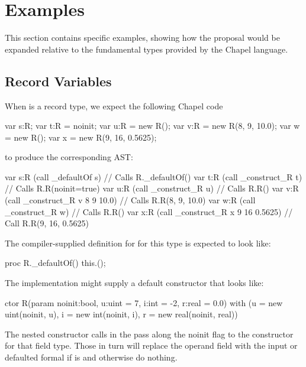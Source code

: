 \section{Examples}
\label{Examples}

This section contains specific examples, showing how the proposal would be expanded
relative to the fundamental types provided by the Chapel language.

\subsection{Record Variables}

When  is a record type, we expect the following Chapel code
\begin{chapel}
  var s:R;
  var t:R = noinit;
  var u:R = new R();
  var v:R = new R(8, 9, 10.0);
  var w = new R();
  var x = new R(9, 16, 0.5625);
\end{chapel}
\noindent
to produce the corresponding AST:
\begin{numberedchapel}
  var s:R
  (call _defaultOf s) // Calls R._defaultOf()
  var t:R
  (call _construct_R t) // Calls R.R(noinit=true)
  var u:R
  (call _construct_R u) // Calls R.R()
  var v:R
  (call _construct_R v 8 9 10.0) // Calls R.R(8, 9, 10.0)
  var w:R
  (call _construct_R w) // Calls R.R()
  var x:R
  (call _construct_R x 9 16 0.5625) // Call R.R(9, 16, 0.5625)
\end{numberedchapel}
The compiler-supplied definition for  for this type is expected to look
like:
\begin{chapel}
  proc R._defaultOf() {
    this.();
  }
\end{chapel}
The implementation might supply a default constructor that looks like:
\begin{chapel}
  ctor R(param noinit:bool, u:uint = 7, i:int = -2, r:real = 0.0)
    with (u = new uint(noinit, u),
          i = new int(noinit, i),
          r = new real(noinit, real)) 
  { }
\end{chapel}
\noindent
The nested constructor calls in the  pass along the noinit flag
to the constructor for that field type.  Those in turn will replace the operand
field with the input or defaulted formal if  is  and otherwise do
nothing.

